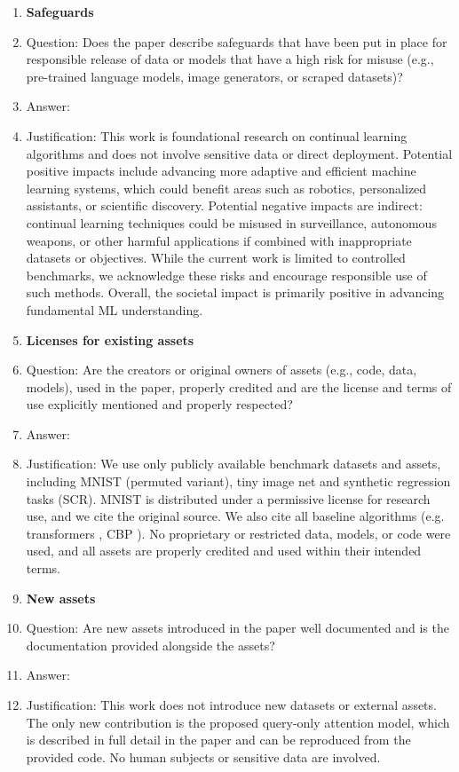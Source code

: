 \begin{enumerate}
\item {\bf Safeguards}
    \item[] Question: Does the paper describe safeguards that have been put in place for responsible release of data or models that have a high risk for misuse (e.g., pre-trained language models, image generators, or scraped datasets)?
    \item[] Answer: \answerYes{} %
    \item[] Justification: This work is foundational research on continual learning algorithms and does not involve sensitive data or direct deployment. 
    Potential positive impacts include advancing more adaptive and efficient machine learning systems, which could benefit areas such as robotics, personalized assistants, or scientific discovery. 
    Potential negative impacts are indirect: continual learning techniques could be misused in surveillance, autonomous weapons, or other harmful applications if combined with inappropriate datasets or objectives. 
    While the current work is limited to controlled benchmarks, we acknowledge these risks and encourage responsible use of such methods. 
    Overall, the societal impact is primarily positive in advancing fundamental ML understanding.

\item {\bf Licenses for existing assets}
    \item[] Question: Are the creators or original owners of assets (e.g., code, data, models), used in the paper, properly credited and are the license and terms of use explicitly mentioned and properly respected?
    \item[] Answer: \answerYes{}   %
    \item[] Justification: We use only publicly available benchmark datasets and assets, including MNIST \citep{lecun1998gradient} (permuted variant), tiny image net and synthetic regression tasks (SCR). 
    MNIST is distributed under a permissive license for research use, and we cite the original source.  
    We also cite all baseline algorithms (e.g. transformers \citep{vaswani2017attention}, CBP \citep{dohare2024loss}).  
    No proprietary or restricted data, models, or code were used, and all assets are properly credited and used within their intended terms. 

\item {\bf New assets}
    \item[] Question: Are new assets introduced in the paper well documented and is the documentation provided alongside the assets?
    \item[] Answer: \answerNA{}   %
    \item[] Justification: This work does not introduce new datasets or external assets. 
    The only new contribution is the proposed query-only attention model, which is described in full detail in the paper and can be reproduced from the provided code. 
    No human subjects or sensitive data are involved. 


\end{enumerate}
